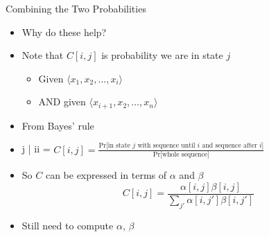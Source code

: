 \documentclass[aspectratio=169]{beamer}
\begin{document}
\begin{frame}{Combining the Two Probabilities}

\begin{itemize}
\item Why do these help?
\item Note that $C[i,j]$ is probability we are in state $j$
	\begin{itemize}
	\item Given $\langle x_1, x_2, ..., x_i \rangle$
	\item AND given $\langle x_{i+1}, x_2, ..., x_n \rangle$
	\end{itemize}
\item From Bayes' rule
\item[] \text{Pr[in state } j  |  ii\text{]} = $C[i,j] = \frac{\text{Pr[in state } j \text{ with sequence until } i \text{ and sequence after } i\text{]} }{\text{Pr[whole sequence]}}$
\item So $C$ can be expressed in terms of $\alpha$ and $\beta$
	 $$C[i,j] = \frac{\alpha[i,j] \beta[i,j]}{\sum_{j'} \alpha[i,j'] \beta[i,j']}$$

\item Still need to compute $\alpha$, $\beta$
\end{itemize}
\end{frame}
\end{document}
